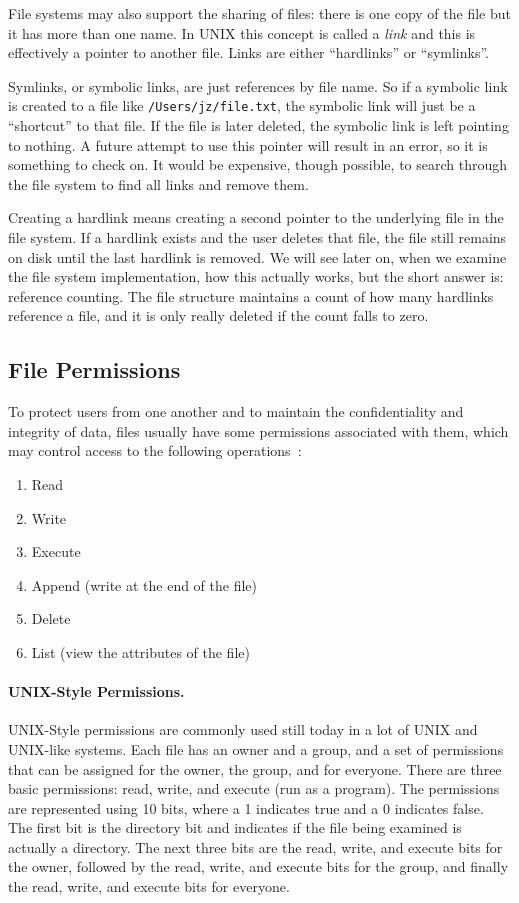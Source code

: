 File systems may also support the sharing of files: there is one copy of the file but it has more than one name. In UNIX this concept is called a \textit{link} and this is effectively a pointer to another file. Links are either ``hardlinks'' or ``symlinks''.

Symlinks, or symbolic links, are just references by file name. So if a symbolic link is created to a file like \texttt{/Users/jz/file.txt}, the symbolic link will just be a ``shortcut'' to that file. If the file is later deleted, the symbolic link is left pointing to nothing. A future attempt to use this pointer will result in an error, so it is something to check on. It would be expensive, though possible, to search through the file system to find all links and remove them.

Creating a hardlink means creating a second pointer to the underlying file in the file system. If a hardlink exists and the user deletes that file, the file still remains on disk until the last hardlink is removed. We will see later on, when we examine the file system implementation, how this actually works, but the short answer is: reference counting. The file structure maintains a count of how many hardlinks reference a file, and it is only really deleted if the count falls to zero.

\subsection*{File Permissions}
To protect users from one another and to maintain the confidentiality and integrity of data, files usually have some permissions associated with them, which may control access to the following operations~\cite{osc}:

\begin{enumerate}
	\item Read
	\item Write
	\item Execute
	\item Append (write at the end of the file)
	\item Delete
	\item List (view the attributes of the file)
\end{enumerate}

\paragraph{UNIX-Style Permissions.}
UNIX-Style permissions are commonly used still today in a lot of UNIX and UNIX-like systems. Each file has an owner and a group, and a set of permissions that can be assigned for the owner, the group, and for everyone. There are three basic permissions: read, write, and execute (run as a program). The permissions are represented using 10 bits, where a 1 indicates true and a 0 indicates false. The first bit is the directory bit and indicates if the file being examined is actually a directory. The next three bits are the read, write, and execute bits for the owner, followed by the read, write, and execute bits for the group, and finally the read, write, and execute bits for everyone.

